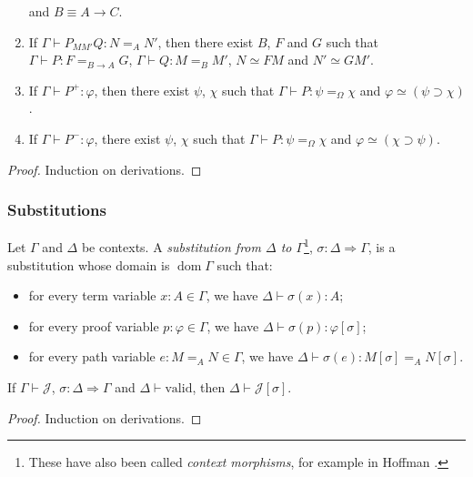 \documentclass[a4paper,UKenglish]{lipics-v2016}
\newcommand*{\vald}{\ensuremath{\vdash \mathrm{valid}}}
\newcommand*{\dom}{\ensuremath{\operatorname{dom}}}
\theoremstyle{plain}
\theoremstyle{definition}
\begin{document}
\begin{lemma}[Generation]
\begin{enumerate}
and $B \equiv A \rightarrow C$.
\item
If $\Gamma \vdash P_{M M'} Q : N =_A N'$, then there exist $B$, $F$ and $G$ such that $\Gamma \vdash P : F =_{B \rightarrow A} G$, $\Gamma \vdash Q : M =_B M'$, $N \simeq F M$
and $N' \simeq G M'$.
\item
If $\Gamma \vdash P^+ : \varphi$, then there exist $\psi$, $\chi$ such that $\Gamma \vdash P : \psi =_\Omega \chi$ and $\varphi \simeq (\psi \supset \chi)$.
\item
If $\Gamma \vdash P^- : \varphi$, there exist $\psi$, $\chi$ such that $\Gamma \vdash P : \psi =_\Omega \chi$ and $\varphi \simeq (\chi \supset \psi)$.
\end{enumerate}
\end{lemma}

\begin{proof}
Induction on derivations.
\end{proof}

\subsubsection{Substitutions}

\begin{definition}
Let $\Gamma$ and $\Delta$ be contexts.  A \emph{substitution from $\Delta$ to $\Gamma$}\footnote{These have also been called \emph{context morphisms}, for example in Hoffman \cite{Hofmann97syntaxand}.},
$\sigma : \Delta \Rightarrow \Gamma$,
is a substitution whose domain is $\dom \Gamma$ such that:
\begin{itemize}
\item
for every term variable $x : A \in \Gamma$, we have $\Delta \vdash \sigma(x) : A$;
\item
for every proof variable $p : \varphi \in \Gamma$, we have $\Delta \vdash \sigma(p) : \varphi [ \sigma ]$;
\item
for every path variable $e : M =_A N \in \Gamma$, we have $\Delta \vdash \sigma(e) : M [ \sigma ] =_A N [ \sigma ]$.
\end{itemize}
\end{definition}

\begin{lemma}
If $\Gamma \vdash \mathcal{J}$, $\sigma : \Delta \Rightarrow \Gamma$ and $\Delta \vald$, then $\Delta \vdash \mathcal{J} [\sigma]$.
\end{lemma}

\begin{proof}
Induction on derivations.
\end{proof}
\end{document}
